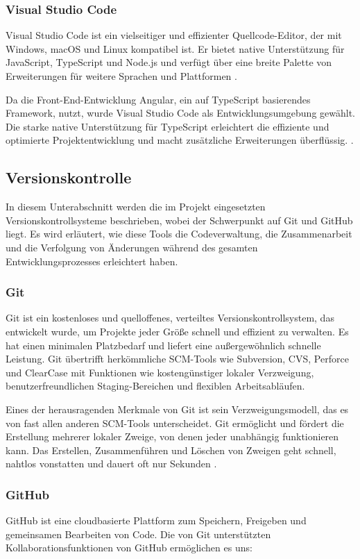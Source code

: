 \subsubsection{Visual Studio Code}

 Visual Studio Code ist ein vielseitiger und effizienter Quellcode-Editor, der mit Windows, macOS und Linux kompatibel ist. Er bietet native Unterstützung für JavaScript, TypeScript und Node.js und verfügt über eine breite Palette von Erweiterungen für weitere Sprachen und Plattformen \cite{visual-studio:o.J}.

Da die Front-End-Entwicklung Angular, ein auf TypeScript basierendes Framework, nutzt, wurde Visual Studio Code als Entwicklungsumgebung gewählt. Die starke native Unterstützung für TypeScript erleichtert die effiziente und optimierte Projektentwicklung und macht zusätzliche Erweiterungen überflüssig. \cite{visualstudio-angular:o.J}.

\subsection{Versionskontrolle}
In diesem Unterabschnitt werden die im Projekt eingesetzten Versionskontrollsysteme beschrieben, wobei der Schwerpunkt auf Git und GitHub liegt. Es wird erläutert, wie diese Tools die Codeverwaltung, die Zusammenarbeit und die Verfolgung von Änderungen während des gesamten Entwicklungsprozesses erleichtert haben.
\subsubsection{Git}
Git ist ein kostenloses und quelloffenes, verteiltes Versionskontrollsystem, das entwickelt wurde, um Projekte jeder Größe schnell und effizient zu verwalten. Es hat einen minimalen Platzbedarf und liefert eine außergewöhnlich schnelle Leistung. Git übertrifft herkömmliche SCM-Tools wie Subversion, CVS, Perforce und ClearCase mit Funktionen wie kostengünstiger lokaler Verzweigung, benutzerfreundlichen Staging-Bereichen und flexiblen Arbeitsabläufen.

Eines der herausragenden Merkmale von Git ist sein Verzweigungsmodell, das es von fast allen anderen SCM-Tools unterscheidet. Git ermöglicht und fördert die Erstellung mehrerer lokaler Zweige, von denen jeder unabhängig funktionieren kann. Das Erstellen, Zusammenführen und Löschen von Zweigen geht schnell, nahtlos vonstatten und dauert oft nur Sekunden  \cite{git-scmr:o.J}.

\subsubsection{GitHub}
GitHub ist eine cloudbasierte Plattform zum Speichern, Freigeben und gemeinsamen Bearbeiten von Code. Die von Git unterstützten Kollaborationsfunktionen von GitHub ermöglichen es uns:


